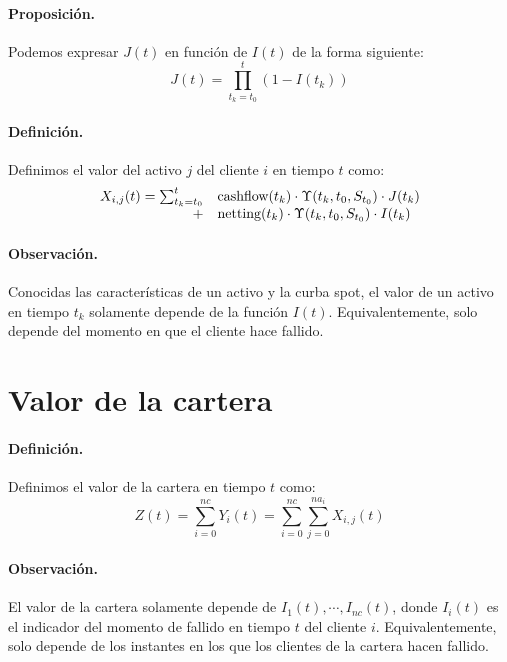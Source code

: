 \paragraph{Proposici\'on.} Podemos expresar $J(t)$ en funci\'on de $I(t)$ de la
forma siguiente:
\begin{displaymath}
J(t) = \prod_{t_k=t_0}^{t} (1-I(t_k))
\end{displaymath}

\paragraph{Definici\'on.} Definimos el valor del activo $j$ del cliente $i$ en 
tiempo $t$ como:
\begin{displaymath}
\begin{array}{rl}
X_{i,j}(t) = \sum_{t_k=t_0}^{t} & \textrm{cashflow}(t_k) \cdot \Upsilon(t_k,t_0, S_{t_0}) \cdot J(t_k) \cr
                              + & \textrm{netting}(t_k)  \cdot \Upsilon(t_k,t_0, S_{t_0}) \cdot I(t_k)
\end{array}
\end{displaymath}

\paragraph{Observaci\'on.} Conocidas las caracter\'isticas de un activo y 
la curba spot, el valor de un activo en tiempo $t_k$ solamente depende de 
la funci\'on $I(t)$. Equivalentemente, solo depende del momento en que el
cliente hace fallido.


\section{Valor de la cartera}

\paragraph{Definici\'on.} Definimos el valor de la cartera en tiempo $t$ como:
\begin{displaymath}
Z(t) = \sum_{i=0}^{nc} Y_i(t) = \sum_{i=0}^{nc} \sum_{j=0}^{na_i} X_{i,j}(t)
\end{displaymath}

\paragraph{Observaci\'on.} El valor de la cartera solamente depende de 
$I_1(t), \cdots, I_{nc}(t)$, donde $I_i(t)$ es el indicador del momento 
de fallido en tiempo $t$ del cliente $i$. Equivalentemente, solo depende 
de los instantes en los que los clientes de la cartera hacen fallido.

